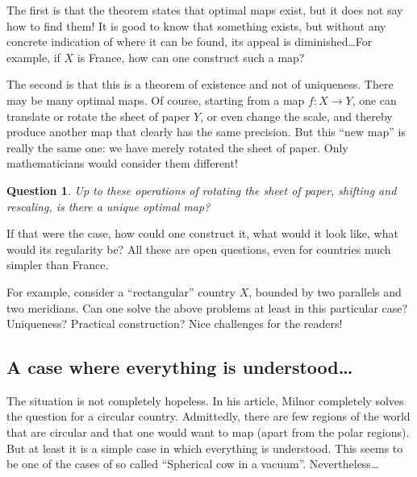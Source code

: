 \documentclass{amsart}
\newtheorem*{question}{Question}
\begin{document}
The first is that the theorem states that optimal maps exist, but it
does not say how to find them! It is good to know that something
exists, but without any concrete indication of where it can be found,
its appeal is diminished\dots For example, if $X$ is France, how can
one construct such a map?

The second is that this is a theorem of existence and not of
uniqueness. There may be many optimal maps. Of course, starting from a
map $f:X \to Y$, one can translate or rotate the sheet of paper $Y$,
or even change the scale, and thereby produce another map that clearly
has the same precision. But this ``new map'' is really the same one:
we have merely rotated the sheet of paper. Only mathematicians would
consider them different!

\begin{question}
  Up to these operations of rotating the sheet of paper, shifting
  and rescaling, is there a unique optimal map?
\end{question}

If that were the case, how could one construct it, what would it look
like, what would its regularity be? All these are open questions, even
for countries much simpler than France.

For example, consider a ``rectangular'' country $X$, bounded by two
parallels and two meridians. Can one solve the above problems at least
in this particular case? Uniqueness? Practical construction? Nice
challenges for the readers!

\subsection{A case where everything is understood\dots}
The situation is not completely hopeless. In his article, Milnor
completely solves the question for a circular country. Admittedly,
there are few regions of the world that are circular and that one
would want to map (apart from the polar regions). But at least it is a
simple case in which everything is understood. This seems to be one of
the cases of so called ``Spherical cow in a vacuum''.%
Nevertheless\dots
\end{document}
